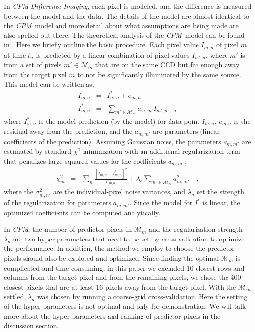 \documentclass[12pt, preprint]{aastex}
\newcommand{\project}[1]{\textsl{#1}}
\newcommand{\cpm}{\project{CPM}}
\newcommand{\cpmdiff}{\project{CPM Difference Imaging}}
\newcommand{\set}[1]{\mathcal{#1}}
\begin{document}
In \cpmdiff, each pixel is modeled, and the difference is measured between the model and the data. 
The details of the model are almost identical to the \cpm\ model \citep{cpm} and more detail about what assumptions are being made are also spelled out there. 
The theoretical analysis of the \cpm\ model can be found in \cite{pnas}.
Here we briefly outline the basic procedure. 
Each pixel value $I_{m,n}$ of pixel $m$ at time $t_n$ is predicted by a linear combination of pixel values $I_{m',n}$, where $m'$ is from a set of pixels $m'\in\set{M}_m$ that are on the same CCD but far enough away from the target pixel $m$ to not be significantly illuminated by the same source. 
This model can be written as,
\begin{eqnarray}
I_{m,n}         &=& I^{\ast}_{m,n} + e_{m,n}
\\
I^{\ast}_{m,n}  &=& \sum_{m'\in\set{M}_m} a_{m,m'}I_{m',n} 
\quad,
\end{eqnarray}
where $I^{\ast}_{m,n}$ is the model prediction (by the model) for data point $I_{m,n}$, $e_{m,n}$ is the residual away from the prediction, and the $a_{m,m'}$ are parameters (linear coefficients of the prediction).
Assuming Gaussian noise, the parameters $a_{m,m'}$ are estimated by standard $\chi^2$ minimization with an additional regularization term that penalizes large squared values for the coefficients $a_{m,m'}$:
\begin{eqnarray}
\chi^2_{m}    &=& \sum_{n} \frac{[I_{m,n} - I^{\ast}_{m,n}]^2}{\sigma^2_{m,n}}+ \lambda_{a}\sum_{m'\in\set{M}_m}a_{m,m'}^2 
\quad,
\end{eqnarray}
where the $\sigma^2_{m,n'}$ are the individual-pixel noise variances, and $\lambda_{a}$ set the strength of the regularization for parameters $a_{m,m'}$.
Since the model for $I^{\ast}$ is linear, the optimized coefficients can be computed analytically.

In \cpm, the number of predictor pixels in $\set{M}_m$ and the regularization strength $\lambda_{a}$ are two hyper-parameters that need to be set by cross-validation to optimize the performance. 
In addition, the method we employ to choose the predictor pixels should also be explored and optimized.
Since finding the optimal $\set{M}_m$ is complicated and time-consuming, in this paper we excluded 10 closest rows and columns from the target pixel and from the remaining pixels, we chose the 400 closest pixels that are at least 16 pixels away from the target pixel.
With the $\set{M}_m$ settled, $\lambda_{a}$ was chosen by running a coarse-grid cross-validation. 
Here the setting of the hyper-parameters is not optimal and only for demonstration. 
We will talk more about the hyper-parameters and ranking of predictor pixels in the discussion section.
\end{document}
